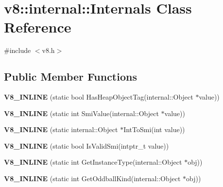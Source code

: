\hypertarget{classv8_1_1internal_1_1_internals}{}\section{v8\+:\+:internal\+:\+:Internals Class Reference}
\label{classv8_1_1internal_1_1_internals}


{\ttfamily \#include $<$v8.\+h$>$}

\subsection*{Public Member Functions}
\begin{DoxyCompactItemize}
\item 
\hypertarget{classv8_1_1internal_1_1_internals_a52f44fc3c5e19b1caa2acaa066f32632}{}{\bfseries V8\+\_\+\+I\+N\+L\+I\+N\+E} (static bool Has\+Heap\+Object\+Tag(internal\+::\+Object $\ast$value))\label{classv8_1_1internal_1_1_internals_a52f44fc3c5e19b1caa2acaa066f32632}

\item 
\hypertarget{classv8_1_1internal_1_1_internals_a7d7e7480933a759c01abac08bd6381aa}{}{\bfseries V8\+\_\+\+I\+N\+L\+I\+N\+E} (static int Smi\+Value(internal\+::\+Object $\ast$value))\label{classv8_1_1internal_1_1_internals_a7d7e7480933a759c01abac08bd6381aa}

\item 
\hypertarget{classv8_1_1internal_1_1_internals_ad33ce42ab342b8fa92af7926c411571b}{}{\bfseries V8\+\_\+\+I\+N\+L\+I\+N\+E} (static internal\+::\+Object $\ast$Int\+To\+Smi(int value))\label{classv8_1_1internal_1_1_internals_ad33ce42ab342b8fa92af7926c411571b}

\item 
\hypertarget{classv8_1_1internal_1_1_internals_a131c65815ef4862db9958033e24d32fb}{}{\bfseries V8\+\_\+\+I\+N\+L\+I\+N\+E} (static bool Is\+Valid\+Smi(intptr\+\_\+t value))\label{classv8_1_1internal_1_1_internals_a131c65815ef4862db9958033e24d32fb}

\item 
\hypertarget{classv8_1_1internal_1_1_internals_a1114867607d59c883c27ac4f1a2d8f3a}{}{\bfseries V8\+\_\+\+I\+N\+L\+I\+N\+E} (static int Get\+Instance\+Type(internal\+::\+Object $\ast$obj))\label{classv8_1_1internal_1_1_internals_a1114867607d59c883c27ac4f1a2d8f3a}

\item 
\hypertarget{classv8_1_1internal_1_1_internals_af5f5ae125fa4e6e8a9465a70cda31ae3}{}{\bfseries V8\+\_\+\+I\+N\+L\+I\+N\+E} (static int Get\+Oddball\+Kind(internal\+::\+Object $\ast$obj))\label{classv8_1_1internal_1_1_internals_af5f5ae125fa4e6e8a9465a70cda31ae3}


\end{DoxyCompactItemize}
